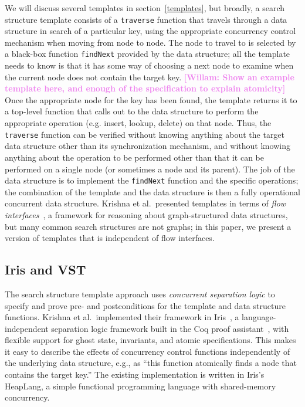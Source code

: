 \documentclass[a4paper,UKenglish,cleveref, autoref, thm-restate]{lipics-v2021}
\newcommand{\wm}[1]{\textbf{\textcolor{violet}{[Willam: #1]}}}
\begin{document}
We will discuss several templates in section~\ref{templates}, but broadly, a search structure template consists of a \lstinline{traverse} function that travels through a data structure in search of a particular key, using the appropriate concurrency control mechanism when moving from node to node. The node to travel to is selected by a black-box function \lstinline{findNext} provided by the data structure; all the template needs to know is that it has some way of choosing a next node to examine when the current node does not contain the target key. \wm{Show an example template here, and enough of the specification to explain atomicity} Once the appropriate node for the key has been found, the template returns it to a top-level function that calls out to the data structure to perform the appropriate operation (e.g. insert, lookup, delete) on that node. Thus, the \lstinline{traverse} function can be verified without knowing anything about the target data structure other than its synchronization mechanism, and without knowing anything about the operation to be performed other than that it can be performed on a single node (or sometimes a node and its parent). The job of the data structure is to implement the \lstinline{findNext} function and the specific operations; the combination of the template and the data structure is then a fully operational concurrent data structure. Krishna et al.~presented templates in terms of \emph{flow interfaces}~\cite{krishna2017flow}, a framework for reasoning about graph-structured data structures, but many common search structures are not graphs; in this paper, we present a version of templates that is independent of flow interfaces. %

\subsection{Iris and VST}
The search structure template approach uses \emph{concurrent separation logic} to specify and prove pre- and postconditions for the template and data structure functions. Krishna et al.~implemented their framework in Iris~\cite{iris}, a language-independent separation logic framework built in the Coq proof assistant~\cite{coq}, with flexible support for ghost state, invariants, and atomic specifications. This makes it easy to describe the effects of concurrency control functions independently of the underlying data structure, e.g., as ``this function atomically finds a node that contains the target key.'' %
The existing implementation is written in Iris's HeapLang, a simple functional programming language with shared-memory concurrency.
\end{document}

